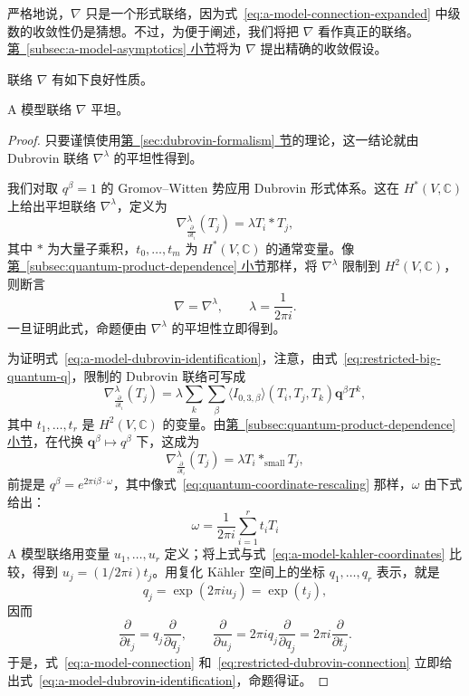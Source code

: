 严格地说，$\nabla$ 只是一个形式联络，因为式~\eqref{eq:a-model-connection-expanded} 中级数的收敛性仍是猜想。不过，为便于阐述，我们将把 $\nabla$ 看作真正的联络。\hyperref[subsec:a-model-asymptotics]{第~\ref*{subsec:a-model-asymptotics} 小节}将为 $\nabla$ 提出精确的收敛假设。

联络 $\nabla$ 有如下良好性质。
\begin{proposition}\label{prop:a-model-flat}
A 模型联络 $\nabla$ 平坦。
\end{proposition}
\begin{proof}
只要谨慎使用\hyperref[sec:dubrovin-formalism]{第~\ref*{sec:dubrovin-formalism} 节}的理论，这一结论就由 Dubrovin 联络 $\nabla^\lambda$ 的平坦性得到。

我们对取 $q^\beta=1$ 的 Gromov--Witten 势应用 Dubrovin 形式体系。这在 $H^*(V,\mathbb C)$ 上给出平坦联络 $\nabla^\lambda$，定义为
\begin{equation}\label{eq:dubrovin-big-quantum-connection}
\nabla^\lambda_{\frac{\partial}{\partial t_i}}(T_j)=\lambda T_i*T_j,
\end{equation}
其中 $*$ 为大量子乘积，$t_0,\ldots,t_m$ 为 $H^*(V,\mathbb C)$ 的通常变量。像\hyperref[subsec:quantum-product-dependence]{第~\ref*{subsec:quantum-product-dependence} 小节}那样，将 $\nabla^\lambda$ 限制到 $H^2(V,\mathbb C)$，则断言
\begin{equation}\label{eq:a-model-dubrovin-identification}
\nabla=\nabla^\lambda,\qquad\lambda=\frac1{2\pi i}.
\end{equation}
一旦证明此式，命题便由 $\nabla^\lambda$ 的平坦性立即得到。

为证明式~\eqref{eq:a-model-dubrovin-identification}，注意，由式~\eqref{eq:restricted-big-quantum-q}，限制的 Dubrovin 联络可写成
\[
\nabla^\lambda_{\frac{\partial}{\partial t_i}}(T_j)
=\lambda\sum_k\sum_\beta\langle I_{0,3,\beta}\rangle(T_i,T_j,T_k)\mathbf q^\beta T^k,
\]
其中 $t_1,\ldots,t_r$ 是 $H^2(V,\mathbb C)$ 的变量。由\hyperref[subsec:quantum-product-dependence]{第~\ref*{subsec:quantum-product-dependence} 小节}，在代换 $\mathbf q^\beta\mapsto q^\beta$ 下，这成为
\begin{equation}\label{eq:restricted-dubrovin-connection}
\nabla^\lambda_{\frac{\partial}{\partial t_i}}(T_j)=\lambda T_i*_{\mathrm{small}}T_j,
\end{equation}
前提是 $q^\beta=e^{2\pi i\beta\cdot\omega}$，其中像式~\eqref{eq:quantum-coordinate-rescaling} 那样，$\omega$ 由下式给出：
\[
\omega=\frac1{2\pi i}\sum_{i=1}^rt_iT_i
\]
%
A 模型联络用变量 $u_1,\ldots,u_r$ 定义；将上式与式~\eqref{eq:a-model-kahler-coordinates} 比较，得到 $u_j=(1/2\pi i)t_j$。用复化 Kähler 空间上的坐标 $q_1,\ldots,q_r$ 表示，就是
\[
q_j=\exp(2\pi iu_j)=\exp(t_j),
\]
因而
\begin{equation}\label{eq:a-model-coordinate-derivatives}
\frac{\partial}{\partial t_j}=q_j\frac{\partial}{\partial q_j},
\qquad
\frac{\partial}{\partial u_j}=2\pi iq_j\frac{\partial}{\partial q_j}
=2\pi i\frac{\partial}{\partial t_j}.
\end{equation}
于是，式~\eqref{eq:a-model-connection} 和~\eqref{eq:restricted-dubrovin-connection} 立即给出式~\eqref{eq:a-model-dubrovin-identification}，命题得证。
\end{proof}

